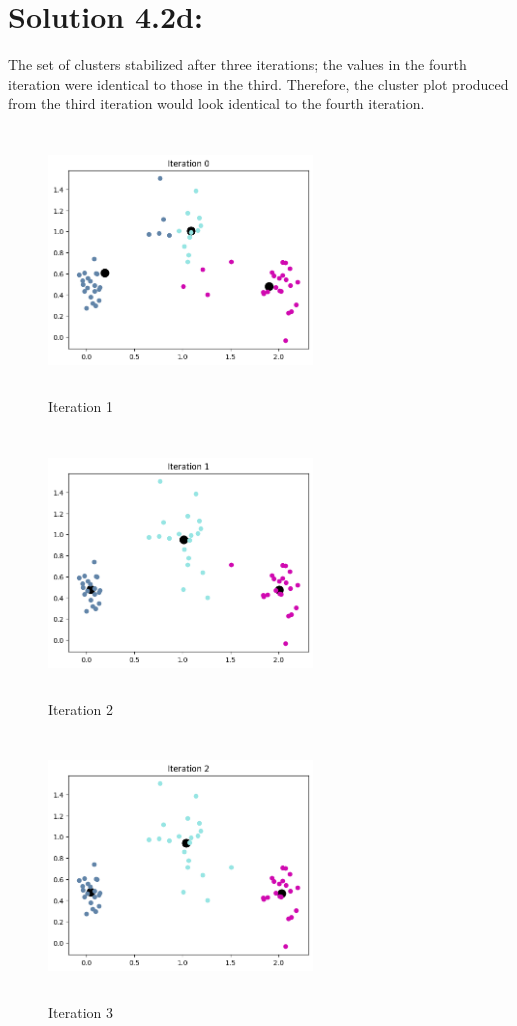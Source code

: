 \documentclass[10pt]{article}
\begin{document}
\section*{Solution 4.2d:}

The set of clusters stabilized after three iterations; the values in the fourth iteration were identical to those in the third. Therefore, the cluster plot produced from the third iteration would look identical to the fourth iteration. \\

\begin{figure}[H]
  \centering
  \includegraphics[width=7cm, height=7cm]{images/4.2d_1.png}
  \caption{Iteration 1}
  \label{fig:Clusters}
\end{figure}

\begin{figure}[H]
  \centering
  \includegraphics[width=7cm, height=7cm]{images/4.2d_2.png}
  \caption{Iteration 2}
  \label{fig:Clusters}
\end{figure}

\begin{figure}[H]
  \centering
  \includegraphics[width=7cm, height=7cm]{images/4.2d_3.png}
  \caption{Iteration 3}
  \label{fig:Clusters}
\end{figure}
\end{document}
